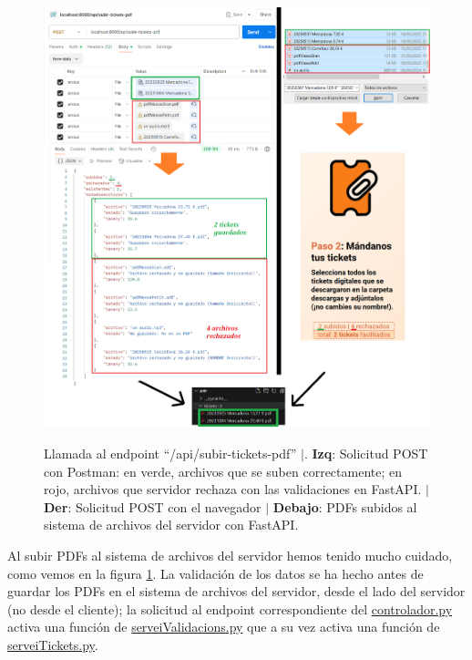 \documentclass[a4paper,12pt]{report}
\begin{document}
	
	\FloatBarrier
	\setlength{\belowcaptionskip}{3pt}
	\begin{figure}[H]
		\centering
		\caption{Llamada al endpoint ``/api/subir-tickets-pdf'' $|$.\textbf{ Izq}: Solicitud POST con Postman: en verde, archivos que se suben correctamente; en rojo, archivos que servidor rechaza con las validaciones en FastAPI. $|$ \textbf{Der}: Solicitud POST con el navegador $|$ \textbf{Debajo}: PDFs subidos al sistema de archivos del servidor con FastAPI.}
		\includegraphics[width=1\linewidth]{img/validacionsArxiusPujadaEndpointTickets} 
		\label{fig:validacionsArxiusPujadaEndpointTickets}
	\end{figure}
	\FloatBarrier
	
	
	Al subir PDFs al sistema de archivos del servidor hemos tenido mucho cuidado, como vemos en la figura \ref{fig:validacionsArxiusPujadaEndpointTickets}.
	La validación de los datos se ha hecho antes de guardar los PDFs en el sistema de archivos del servidor, desde el lado del servidor (no desde el cliente); la solicitud al endpoint correspondiente del \href{https://github.com/blackcub3s/mercApp/blob/main/APP%20WEB/__FastAPI__/app/controlador.py}{controlador.py} activa una función de \href{https://github.com/blackcub3s/mercApp/blob/main/APP%20WEB/__FastAPI__/app/serveiValidacions.py}{serveiValidacions.py} que a su vez activa una función de \href{https://github.com/blackcub3s/mercApp/blob/main/APP%20WEB/__FastAPI__/app/serveiTickets.py}{serveiTickets.py}.
	
\end{document}

